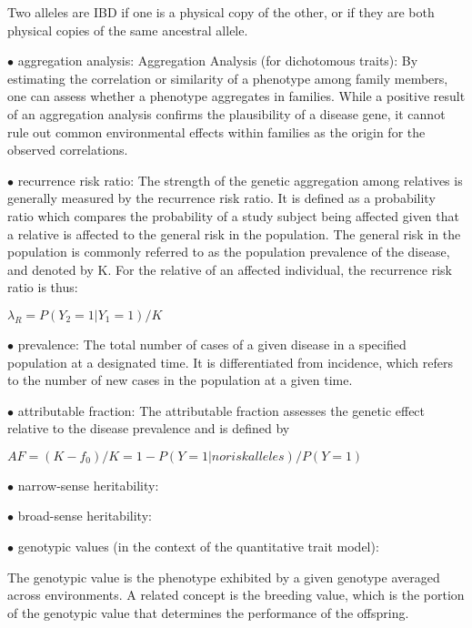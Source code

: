 \documentclass{article}
\begin{document}
Two alleles are IBD if one is a physical copy of the other, or if they are both physical copies of the same ancestral allele.

\vspace{1pc}
$\bullet$ aggregation analysis:
Aggregation Analysis (for dichotomous traits): By estimating the correlation or
similarity of a phenotype among family members, one can assess whether a phenotype
aggregates in families. While a positive result of an aggregation analysis
confirms the plausibility of a disease gene, it cannot rule out common environmental
effects within families as the origin for the observed correlations.


\vspace{1pc}
$\bullet$ recurrence risk ratio:
The strength of the genetic aggregation among relatives is generally measured
by the recurrence risk ratio. It is defined as a probability ratio which compares
the probability of a study subject being affected given that a relative is affected to
the general risk in the population. The general risk in the population is commonly
referred to as the population prevalence of the disease, and denoted by K. For the
relative of an affected individual, the recurrence risk ratio is thus:

$\lambda_R = P(Y_2 = 1 | Y_1 = 1) / K
$

\vspace{1pc}
$\bullet$ prevalence:
The total number of cases of a given disease in a specified population at a designated time. It is differentiated from incidence, which refers to the number of new cases in the population at a given time.


\vspace{1pc}
$\bullet$ attributable fraction:
The attributable fraction assesses the genetic effect relative to the
disease prevalence and is defined by

  $ AF = (K - f_0) / K=1-P(Y = 1 | no risk alleles)/P(Y=1)
  $


\vspace{1pc}
$\bullet$ narrow-sense heritability:


\vspace{1pc}
$\bullet$ broad-sense heritability:


\vspace{1pc}
$\bullet$ genotypic values (in the context of the quantitative trait model):

The genotypic value is the phenotype exhibited by a given genotype averaged across environments. A related concept is the breeding value, which is the portion of the genotypic value that determines the performance of the offspring.
\end{document}
